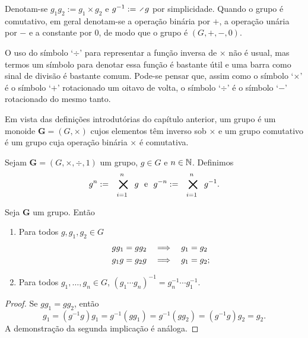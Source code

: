 \begin{notation}
Denotam-se $g_1g_2 := g_1 \times g_2$ e $g\inv := \div g$ por simplicidade. Quando o grupo é comutativo, em geral denotam-se a operação binária por $+$, a operação unária por $-$ e a constante por $0$, de modo que o grupo é $(G,+,-,0)$.
\end{notation}

O uso do símbolo `$\div$' para representar a função inversa de $\times$ não é usual, mas termos um símbolo para denotar essa função é bastante útil e uma barra como sinal de divisão é bastante comum. Pode-se pensar que, assim como o símbolo `$\times$' é o símbolo `$+$' rotacionado um oitavo de volta, o símbolo `$\div$' é o símbolo `$-$' rotacionado do mesmo tanto.

Em vista das definições introdutórias do capítulo anterior, um grupo é um monoide $\bm G=(G, \times)$ cujos elementos têm inverso sob $\times$ e um grupo comutativo é um grupo cuja operação binária $\times$ é comutativa.

\begin{definition}
Sejam $\bm G = (G,\times,\div,1)$ um grupo, $g \in G$ e $n \in \mathbb{N}$. Definimos
	\begin{equation*}
	g^n := \bigtimes_{i=1}^n g \e g^{-n} := \bigtimes_{i=1}^n g^{-1}.
	\end{equation*}
\end{definition}

\begin{proposition}
	Seja $\bm G$ um grupo. Então
	\begin{enumerate}
	\item Para todos $g,g_1,g_2 \in G$ 
		\begin{align*}
		gg_1 = gg_2 &\quad \Longrightarrow \quad g_1 = g_2 \\
		g_1g = g_2g &\quad \Longrightarrow \quad g_1 = g_2;
		\end{align*}
	\item Para todos $g_1,\ldots,g_n \in G$, $(g_1 \cdots g_n)^{-1}=g_n^{-1} \cdots g_1^{-1}$.
	\end{enumerate}
\end{proposition}
\begin{proof}
	Se $g g_1 = g g_2$, então
	\begin{equation*}
	g_1 = (g^{-1}g)g_1 = g^{-1}(gg_1) = g^{-1}(gg_2) = (g^{-1}g)g_2 = g_2.
	\end{equation*}
A demonstração da segunda implicação é análoga.
\end{proof}

